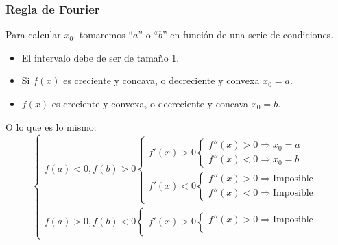 \subsubsection{Regla de Fourier}
\noindent Para calcular \(x_0\), tomaremos ``\(a\)'' o ``\(b\)'' en función de una serie de condiciones.
\begin{itemize}
        \item El intervalo debe de ser de tamaño 1.
        \item Si \(f(x)\) es creciente y concava, o decreciente y convexa \(x_0 = a\).
        \item \(f(x)\) es creciente y convexa, o decreciente y concava \(x_0 = b\).
\end{itemize}
\noindent O lo que es lo mismo:
\[
        \boxed{
                \begin{cases}
                        f(a) < 0, f(b) > 0 \begin{cases}
                                                   f'(x) > 0
                                                   \begin{cases}
                                        f''(x) > 0 \Rightarrow x_0 = a
                                        \\
                                        f''(x) < 0 \Rightarrow x_0 = b
                                \end{cases}
                                                   \\
                                                   f'(x) < 0
                                                   \begin{cases}
                                        f''(x) > 0 \Rightarrow \text{Imposible}
                                        \\
                                        f''(x) < 0 \Rightarrow \text{Imposible}
                                \end{cases}
                                           \end{cases}
                        \\
                        f(a) > 0, f(b) < 0
                        \begin{cases}
                                f'(x) > 0
                                \begin{cases}
                                        f''(x) > 0 \Rightarrow \text{Imposible}
                                        \\

\end{cases}
\end{cases}
\end{cases}}\]
